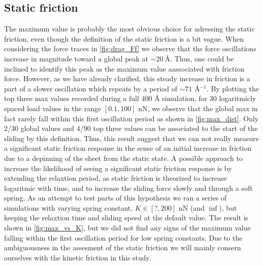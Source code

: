 \subsection{Static friction} 
The maximum value is probably the most obvious choice for adressing the static friction, even though the definition of the static friction is a bit vague. When
considering the force traces in \cref{fig:drag_Ff} we observe that the force oscillations increase in magnitude toward a global peak at $\sim \SI{20}{\text{Å}}$. Thus, one could be inclined to identify this peak as the
maximum value aassociated with friction force. However, as we have already clarified, this steady increase in friction is a part of a slower oscillation which repeats by a period of $\sim 71$ Å$^{-1}$. By plotting the top three max values recorded during a full 400 Å simulation, for 30 logaritmicly spaced load values in the range $[0.1, 100]$ nN, we observe that the global max in fact rarely fall within this first oscillation period as shown in \cref{fig:max_dist}. Only 2/30 global values and 4/90 top three values 
can be associated to the start of the sliding by this definition. Thus, this
result suggest that we can not really measure a significant static friction response in the sense of an initial increase in friction due to a depinning of the sheet from the static state. A possible approach to increase the likelihood of seeing a significant static friction response is by extending the relaxtion period, as static friction is theorized to increase logaritmic with time, and to increase the sliding force slowly and through a soft spring. As an attempt to test parts of this hypothesis we ran a series of simulations with varying spring constant, $K\in [?, 200]$ nN (and $\inf$), but keeping the relaxtion time and sliding speed at the default value. The result is shown in \cref{fig:max_vs_K}, but we did not find any signs of the maximum value falling within the first oscillation period for low spring constants. Due to the ambiguousness in the assesment of the static friction we will mainly consern ourselves with the kinetic friction in this study.







